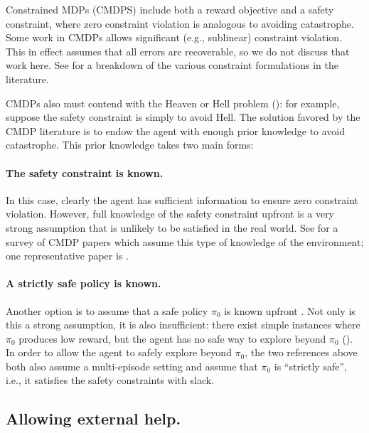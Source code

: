 Constrained MDPs (CMDPS) \citep{altman2021constrained} include both a reward objective and a safety constraint, where zero constraint violation is analogous to avoiding catastrophe. Some work in CMDPs allows significant (e.g., sublinear) constraint violation. This in effect assumes that all errors are recoverable, so we do not discuss that work here. See \citet{wachi_survey_2024} for a breakdown of the various constraint formulations in the literature.

CMDPs also must contend with the Heaven or Hell problem (): for example, suppose the safety constraint is simply to avoid Hell. The solution favored by the CMDP literature is to endow the agent with enough prior knowledge to avoid catastrophe. This prior knowledge takes two main forms:

\paragraph{The safety constraint is known.} In this case, clearly the agent has sufficient information to ensure zero constraint violation. However, full knowledge of the safety constraint upfront is a very strong assumption that is unlikely to be satisfied in the real world. See \citet{zhao_state-wise_2023} for a survey of CMDP papers which assume this type of knowledge of the environment; one representative paper is \citet{model_zhao_22a}.





\paragraph{A strictly safe policy is known.} Another option is to assume that a safe policy $\pi_0$ is known upfront \citep{liu2021learning,stradi2024learning}. Not only is this a strong assumption, it is also insufficient: there exist simple instances where $\pi_0$ produces low reward, but the agent has no safe way to explore beyond $\pi_0$ (). In order to allow the agent to safely explore beyond $\pi_0$, the two references above both also assume a multi-episode setting and assume that $\pi_0$ is ``strictly safe'', i.e., it satisfies the safety constraints with slack.


\subsection{Allowing external help.}

